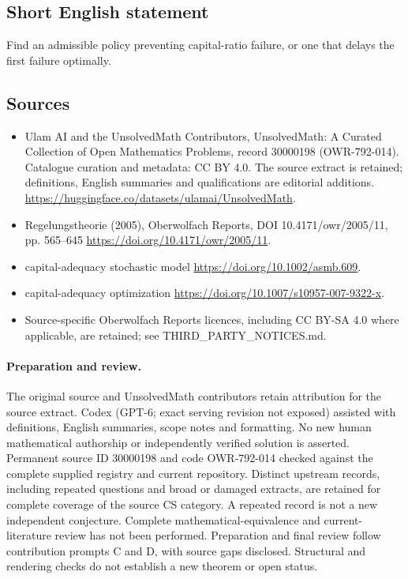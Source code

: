\documentclass[11pt]{article}
\begin{document}
\subsection{Short English statement}
Find an admissible policy preventing capital-ratio failure, or one that delays the first failure optimally.
\subsection{Sources}
\begin{itemize}
\item[\hypertarget{source:30000198:1}{S1}] Ulam AI and the UnsolvedMath Contributors, UnsolvedMath: A Curated Collection of Open Mathematics Problems, record 30000198 (OWR-792-014). Catalogue curation and metadata: CC BY 4.0. The source extract is retained; definitions, English summaries and qualifications are editorial additions.
\url{https://huggingface.co/datasets/ulamai/UnsolvedMath}.
\item[\hypertarget{source:30000198:2}{S2}] Regelungstheorie (2005), Oberwolfach Reports, DOI 10.4171/owr/2005/11, pp. 565--645
\url{https://doi.org/10.4171/owr/2005/11}.
\item[\hypertarget{source:30000198:3}{S3}] capital-adequacy stochastic model
\url{https://doi.org/10.1002/asmb.609}.
\item[\hypertarget{source:30000198:4}{S4}] capital-adequacy optimization
\url{https://doi.org/10.1007/s10957-007-9322-x}.
\item Source-specific Oberwolfach Reports licences, including CC BY-SA 4.0 where applicable, are retained; see THIRD\_PARTY\_NOTICES.md.
\end{itemize}
\paragraph{Preparation and review.}
The original source and UnsolvedMath contributors retain attribution for the source extract. Codex (GPT-6; exact serving revision not exposed) assisted with definitions, English summaries, scope notes and formatting. No new human mathematical authorship or independently verified solution is asserted. Permanent source ID 30000198 and code OWR-792-014 checked against the complete supplied registry and current repository. Distinct upstream records, including repeated questions and broad or damaged extracts, are retained for complete coverage of the source CS category. A repeated record is not a new independent conjecture. Complete mathematical-equivalence and current-literature review has not been performed. Preparation and final review follow contribution prompts C and D, with source gaps disclosed. Structural and rendering checks do not establish a new theorem or open status.
\label{end:30000198}
\end{document}
